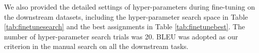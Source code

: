 \documentclass[11pt,a4paper]{article}
\begin{document}
We also provided the detailed settings of hyper-parameters during fine-tuning on the downstream datasets, including the hyper-parameter search space in Table \ref{tab:finetunesearch} and the best assignments in Table \ref{tab:finetunebest}. The number of hyper-parameter search trials was 20. BLEU was adopted as our criterion in the manual search on all the downstream tasks.
\end{document}
